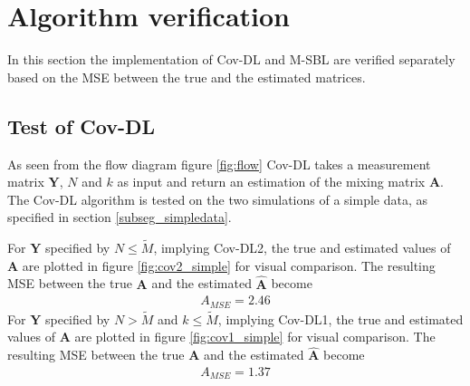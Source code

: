 \section{Algorithm verification}
In this section the implementation of Cov-DL and M-SBL are verified separately based on the MSE between the true and the estimated matrices.

\subsection{Test of Cov-DL}
As seen from the flow diagram figure \ref{fig:flow} Cov-DL takes a measurement matrix $\textbf{Y}$, $N$ and $k$ as input and return an estimation of the mixing matrix $\textbf{A}$. The Cov-DL algorithm is tested on the two simulations of a simple data, as specified in section \ref{subseg_simpledata}. 

For $\textbf{Y}$ specified by $N\leq \widetilde{M}$, implying Cov-DL2, the true and estimated values of $\textbf{A}$ are plotted in figure \ref{fig:cov2_simple} for visual comparison.
The resulting MSE between the true $\textbf{A}$ and the estimated $\hat{\textbf{A}}$ become 
\begin{align*}
A_{MSE} = 2.46 
\end{align*}
For $\textbf{Y}$ specified by $N > \widetilde{M}$ and $k\leq \widetilde{M}$, implying Cov-DL1, the true and estimated values of $\textbf{A}$ are plotted in figure \ref{fig:cov1_simple} for visual comparison.
The resulting MSE between the true $\textbf{A}$ and the estimated $\hat{\textbf{A}}$ become 
\begin{align*}
A_{MSE} = 1.37
\end{align*}

